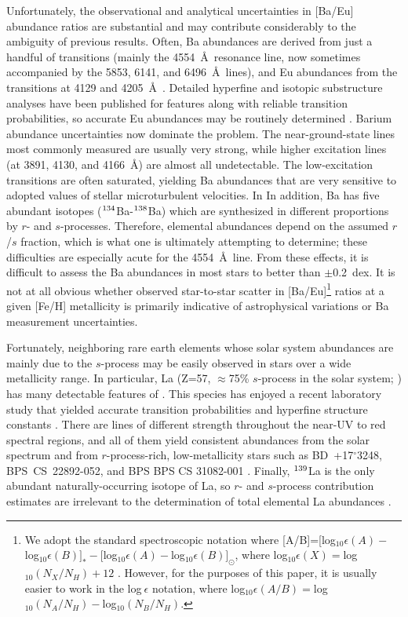 \documentclass[12pt,preprint]{aastex}
\newcommand\iso[2]{$^{\rm #1}$#2}
\def\deg{{$^{\circ}$}}
\def\bd17{\mbox{BD +17\deg 3248}}
\def\cs22{\mbox{BPS CS 22892-052}}
\begin{document}
Unfortunately, the observational and analytical uncertainties in [Ba/Eu] abundance ratios
are substantial and may contribute considerably to the ambiguity of previous results.  Often, Ba abundances are derived from just a handful of  transitions (mainly the 4554~\AA\ resonance line, now sometimes accompanied by the 5853, 6141, and 6496~\AA\ lines), and Eu abundances from the  transitions
at 4129 and 4205~\AA ~\citep{Francois1996, McWilliam1998, Burris2000}. Detailed hyperfine and isotopic substructure analyses have been 
published for  features along with reliable transition probabilities, so accurate Eu abundances may be routinely determined \citep{LawlerEu}.  Barium abundance uncertainties now dominate the problem.  The near-ground-state  lines most commonly measured are usually very strong, while higher excitation lines (at 3891, 4130, and 4166~\AA) are almost all undetectable.
The low-excitation transitions are often saturated, yielding Ba abundances that are very sensitive to adopted values of stellar microturbulent velocities.
In In addition, Ba has five abundant isotopes (\iso{134}{Ba}-\iso{138}{Ba}) which are synthesized in different proportions by $r$- and $s$-processes.  Therefore, elemental abundances depend on the assumed $r$/$s$ fraction, which is what one is ultimately attempting to determine; these difficulties are especially acute for the 4554~\AA ~line.
From these effects, it is difficult to assess the Ba abundances in most stars to better than $\pm$0.2~dex. It is not at all obvious whether observed star-to-star scatter in [Ba/Eu]\footnote{We adopt the standard spectroscopic notation where   [A/B]=[log$_{10}\epsilon(A)-$log$_{10}\epsilon(B)]_*-[$log$_{10}\epsilon(A)-$log$_{10}\epsilon(B)]_{\odot}$, where log$_{10}\epsilon(X)=$log$_{10}(N_X/N_H)+12$ . However, for the purposes of this paper, it is usually easier to work in the log$~\epsilon$ notation, where  log$_{10}\epsilon(A/B)=$log$_{10}(N_A/N_H)-$log$_{10}(N_B/N_H)$. }
ratios at a given [Fe/H] metallicity is primarily indicative of astrophysical variations or Ba measurement uncertainties.

Fortunately, neighboring rare earth elements whose solar system abundances are mainly due to the $s$-process may be easily observed in stars over a wide metallicity range.
In particular, La (Z=57, $\approx$75\% $s$-process in the solar system;
\citealt{Burris2000}) has many detectable features of . 
This species has enjoyed a recent laboratory study that yielded accurate transition probabilities and hyperfine structure constants \citep{LawlerLa}.
There are  lines of different strength throughout the near-UV to red spectral regions, and all of them yield consistent abundances from the solar spectrum and from $r$-process-rich, low-metallicity stars such as \bd17, \cs22, and BPS BPS CS 31082-001 \citep{LawlerLa, CS22892, Hill2002}.  Finally, \iso{139}{La} is the only abundant naturally-occurring isotope of La,
so $r$- and $s$-process contribution estimates are irrelevant to the determination of total elemental La abundances \citep{Lodders2003}.
\end{document}
